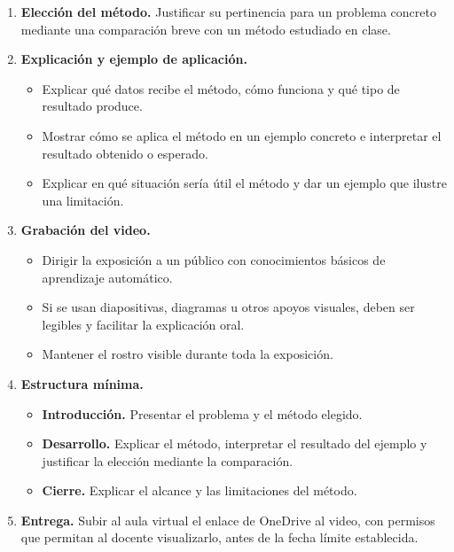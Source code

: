 \documentclass[a4,11pt]{aleph-notas}
\begin{document}
\begin{enumerate}[leftmargin=*]
    \item \textbf{Elección del método.} Justificar su pertinencia para un problema concreto mediante una comparación breve con un método estudiado en clase.

    \item \textbf{Explicación y ejemplo de aplicación.}
    \begin{itemize}
        \item Explicar qué datos recibe el método, cómo funciona y qué tipo de resultado produce.
        \item Mostrar cómo se aplica el método en un ejemplo concreto e interpretar el resultado obtenido o esperado.
        \item Explicar en qué situación sería útil el método y dar un ejemplo que ilustre una limitación.
    \end{itemize}

    \item \textbf{Grabación del video.}
    \begin{itemize}
        \item Dirigir la exposición a un público con conocimientos básicos de aprendizaje automático.
        \item Si se usan diapositivas, diagramas u otros apoyos visuales, deben ser legibles y facilitar la explicación oral.
        \item Mantener el rostro visible durante toda la exposición.
    \end{itemize}

    \item \textbf{Estructura mínima.}
    \begin{itemize}
        \item \textbf{Introducción.} Presentar el problema y el método elegido.
        \item \textbf{Desarrollo.} Explicar el método, interpretar el resultado del ejemplo y justificar la elección mediante la comparación.
        \item \textbf{Cierre.} Explicar el alcance y las limitaciones del método.
    \end{itemize}

    \item \textbf{Entrega.} Subir al aula virtual el enlace de OneDrive al video, con permisos que permitan al docente visualizarlo, antes de la fecha límite establecida.
\end{enumerate}
\end{document}
